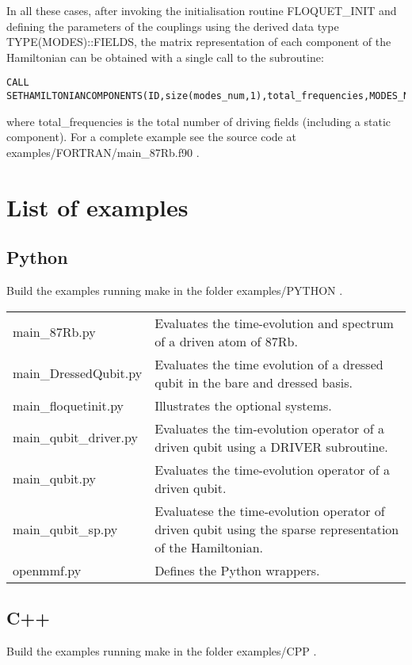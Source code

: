\documentclass[10pt,a4paper]{article}
\begin{document}
In all these cases, after invoking the initialisation routine   FLOQUET\_INIT   and defining the parameters of the couplings using the derived data type   TYPE(MODES)::FIELDS, the matrix representation of each component of the Hamiltonian can be obtained with a single call to the subroutine:
\begin{verbatim}
CALL SETHAMILTONIANCOMPONENTS(ID,size(modes_num,1),total_frequencies,MODES_NUM,FIELDS,INFO) 
\end{verbatim}
where   total\_frequencies   is the total number of driving fields (including a static component). For a complete example see the source code at   examples/FORTRAN/main\_87Rb.f90 .

\section{List of examples}
\subsection{Python}
Build the examples running   make  in the folder   examples/PYTHON  .

\begin{tabular}{p{5.5cm}p{9.5cm}}
main\_87Rb.py & Evaluates the time-evolution and spectrum of a driven atom of 87Rb.\\
main\_DressedQubit.py  & Evaluates the time evolution of a dressed qubit in the bare and dressed basis. \\
main\_floquetinit.py  & Illustrates the optional systems.\\
main\_qubit\_driver.py  & Evaluates the tim-evolution operator of a driven qubit using a DRIVER subroutine.\\
main\_qubit.py  & Evaluates the time-evolution operator of a driven qubit.\\
main\_qubit\_sp.py & Evaluatese the time-evolution operator of driven qubit using the sparse representation of the Hamiltonian.\\  
openmmf.py  & Defines the Python wrappers. 
\end{tabular}
\subsection{C++}
Build the examples running   make  in the folder   examples/CPP  . 
\end{document}
